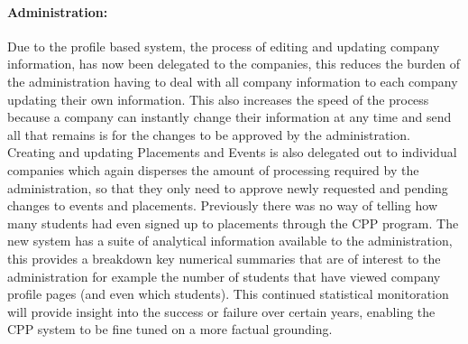 \paragraph{Administration:}
  Due to the profile based system, the process of editing and updating company information, has now been delegated to the companies, this reduces the burden of the administration having to deal with all company information to each company updating their own information. This also increases the speed of the process because a company can instantly change their information at any time and send all that remains is for the changes to be approved by the administration.
  Creating and updating Placements and Events is also delegated out to individual companies which again disperses the amount of processing required by the administration, so that they only need to approve newly requested and pending changes to events and placements.
  Previously there was no way of telling how many students had even signed up to placements through the CPP program. The new system has a suite of analytical information available to the administration, this provides a breakdown key numerical summaries that are of interest to the administration for example the number of students that have viewed company profile pages (and even which students). This continued statistical monitoration will provide insight into the success or failure over certain years, enabling the CPP system to be fine tuned on a more factual grounding. 